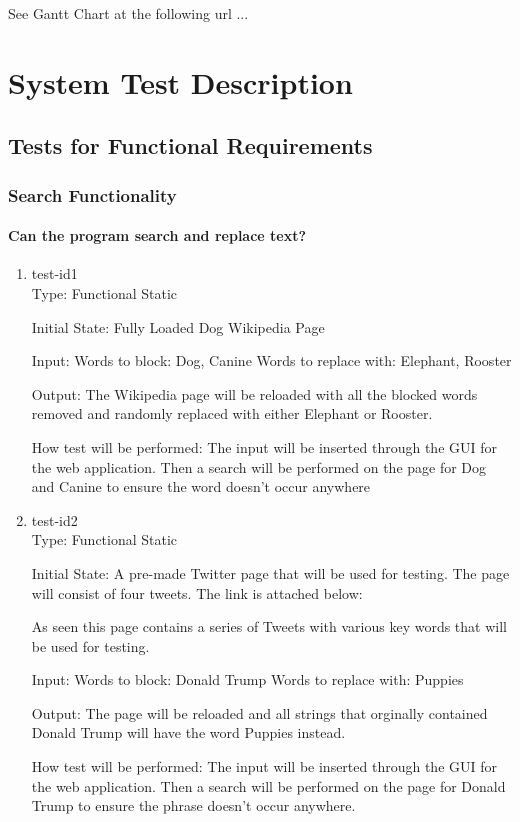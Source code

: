 \documentclass[12pt, titlepage]{article}
\begin{document}
See Gantt Chart at the following url ...
\section{System Test Description}
	
\subsection{Tests for Functional Requirements}
\subsubsection{Search Functionality}
		
\paragraph{Can the program search and replace text?}
\begin{enumerate}
\item{test-id1\\}
Type: Functional Static
					
Initial State: Fully Loaded Dog Wikipedia Page
					
Input: Words to block: Dog, Canine
Words to replace with: Elephant, Rooster
					
Output: The Wikipedia page will be reloaded with all the blocked words removed and randomly replaced with either Elephant or Rooster.
					
How test will be performed: The input will be inserted through the GUI for the web application. Then a search will be performed on the page for Dog and Canine to ensure the word doesn't occur anywhere
					
\item{test-id2\\}
Type: Functional Static
					
Initial State: A pre-made Twitter page that will be used for testing. The page will consist of four tweets. The link is attached below:

As seen this page contains a series of Tweets with various key words that will be used for testing.
					
Input:  Words to block: Donald Trump
Words to replace with: Puppies
					
Output: The page will be reloaded and all strings that orginally contained Donald Trump will have the word Puppies instead. 

How test will be performed: The input will be inserted through the GUI for the web application. Then a search will be performed on the page for Donald Trump to ensure the phrase doesn't occur anywhere.
\end{enumerate}
\end{document}
